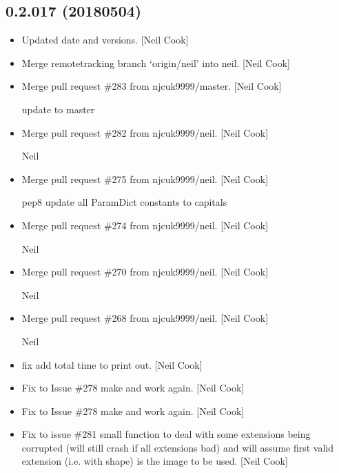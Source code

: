 \documentclass[a4paper,10pt,english]{report}
\begin{document}
\subsection{0.2.017 (2018\sphinxhyphen{}05\sphinxhyphen{}04)}
\label{\detokenize{misc/changelog:id463}}\begin{itemize}
\item {} 
Updated date and versions. {[}Neil Cook{]}

\item {} 
Merge remote\sphinxhyphen{}tracking branch ‘origin/neil’ into neil. {[}Neil Cook{]}

\item {} 
Merge pull request \#283 from njcuk9999/master. {[}Neil Cook{]}

update to master

\item {} 
Merge pull request \#282 from njcuk9999/neil. {[}Neil Cook{]}

Neil

\item {} 
Merge pull request \#275 from njcuk9999/neil. {[}Neil Cook{]}

pep8 update all ParamDict constants to capitals

\item {} 
Merge pull request \#274 from njcuk9999/neil. {[}Neil Cook{]}

Neil

\item {} 
Merge pull request \#270 from njcuk9999/neil. {[}Neil Cook{]}

Neil

\item {} 
Merge pull request \#268 from njcuk9999/neil. {[}Neil Cook{]}

Neil

\item {} 
 fix \sphinxhyphen{} add total time to  print out. {[}Neil Cook{]}

\item {} 
Fix to Issue \#278 \sphinxhyphen{} make  and
 work again. {[}Neil Cook{]}

\item {} 
Fix to Issue \#278 \sphinxhyphen{} make  and
 work again. {[}Neil Cook{]}

\item {} 
Fix to issue \#281 \sphinxhyphen{} small function to deal with some extensions being
corrupted (will still crash if all extensions bad) and will assume
first valid extension (i.e. with shape) is the image to be used. {[}Neil
Cook{]}


\end{itemize}
\end{document}
